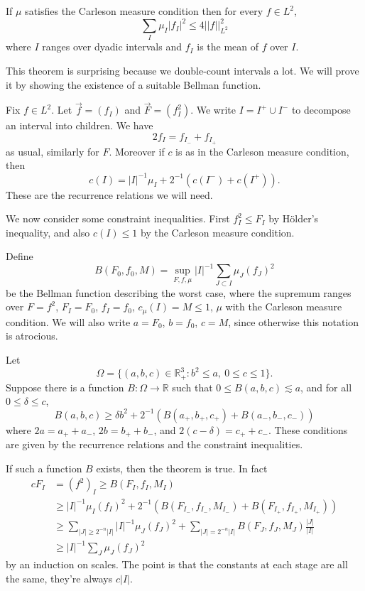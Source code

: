 \documentclass[12pt]{book}
\newcommand{\RR}{\mathbb{R}}
\theoremstyle{definition}
\newenvironment{theoremx}
        {\pushQED{\qed}\renewcommand{\qedsymbol}{$\diamondsuit$}\theoremxx}
        {\popQED\endexamplex}
\begin{document}
\begin{theoremx}
If $\mu$ satisfies the Carleson measure condition then for every $f \in L^2$,
$$\sum_I \mu_I |f_I|^2 \leq 4||f||_{L^2}^2$$
where $I$ ranges over dyadic intervals and $f_I$ is the mean of $f$ over $I$.
\end{theoremx}

This theorem is surprising because we double-count intervals a lot.
We will prove it by showing the existence of a suitable Bellman function.

Fix $f \in L^2$.
Let $\vec f = (f_I)$ and $\vec F = (f^2_I)$.
We write $I = I^+ \cup I^-$ to decompose an interval into children.
We have
$$2f_I = f_{I_-} + f_{I_+}$$
as usual, similarly for $F$.
Moreover if $c$ is as in the Carleson measure condition, then
$$c(I) = |I|^{-1}\mu_I + 2^{-1}(c(I^-) + c(I^+)).$$
These are the recurrence relations we will need.

We now consider some constraint inequalities. First $f^2_I \leq F_I$ by H\"older's inequality, and also $c(I) \leq 1$ by the Carleson measure condition.

Define
$$B(F_0, f_0, M) = \sup_{F,f,\mu} |I|^{-1} \sum_{J \subset I} \mu_J (f_J)^2$$
be the Bellman function describing the worst case, where the supremum ranges over $F = f^2$, $F_I = F_0$, $f_I = f_0$, $c_\mu(I) = M \leq 1$, $\mu$ with the Carleson measure condition.
We will also write $a = F_0$, $b = f_0$, $c = M$, since otherwise this notation is atrocious.

Let
$$\Omega = \{(a, b, c) \in \RR^3_+: b^2 \leq a, ~0 \leq c \leq 1\}.$$
Suppose there is a function $B: \Omega \to \RR$ such that $0 \leq B(a, b, c) \lesssim a$, and for all $0 \leq \delta \leq c$,
$$B(a, b, c) \geq \delta b^2 + 2^{-1}(B(a_+, b_+, c_+) + B(a_-, b_-, c_-))$$
where $2a = a_+ + a_-$, $2b = b_+ + b_-$, and $2(c - \delta) = c_+ + c_-$.
These conditions are given by the recurrence relations and the constraint inequalities.

If such a function $B$ exists, then the theorem is true. In fact
\begin{align*}
cF_I &= (f^2)_I \geq B(F_I, f_I, M_I) \\
&\geq |I|^{-1}\mu_I (f_I)^2 + 2^{-1}(B(F_{I_-}, f_{I_-}, M_{I_-}) + B(F_{I_+}, f_{I_+}, M_{I_+}))\\
&\geq \sum_{|J| \geq 2^{-n}|I|} |I|^{-1} \mu_J(f_J)^2 + \sum_{|J| = 2^{-n}|I|} B(F_J, f_J, M_J)\frac{|J|}{|I|}\\
&\geq |I|^{-1} \sum_J \mu_J (f_J)^2
\end{align*}
by an induction on scales.
The point is that the constants at each stage are all the same, they're always $c|I|$.
\end{document}
